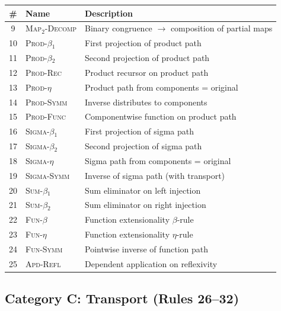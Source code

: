 \documentclass[manuscript]{BSLstyle}
\begin{document}
\begin{center}
\renewcommand{\arraystretch}{1.4}
\small
\begin{tabular}{clp{7cm}}
\toprule
\# & \textbf{Name} & \textbf{Description} \\
\midrule
9 & \textsc{Map$_2$-Decomp} & Binary congruence $\to$ composition of partial maps \\
10 & \textsc{Prod-$\beta_1$} & First projection of product path \\
11 & \textsc{Prod-$\beta_2$} & Second projection of product path \\
12 & \textsc{Prod-Rec} & Product recursor on product path \\
13 & \textsc{Prod-$\eta$} & Product path from components = original \\
14 & \textsc{Prod-Symm} & Inverse distributes to components \\
15 & \textsc{Prod-Func} & Componentwise function on product path \\
16 & \textsc{Sigma-$\beta_1$} & First projection of sigma path \\
17 & \textsc{Sigma-$\beta_2$} & Second projection of sigma path \\
18 & \textsc{Sigma-$\eta$} & Sigma path from components = original \\
19 & \textsc{Sigma-Symm} & Inverse of sigma path (with transport) \\
20 & \textsc{Sum-$\beta_1$} & Sum eliminator on left injection \\
21 & \textsc{Sum-$\beta_2$} & Sum eliminator on right injection \\
22 & \textsc{Fun-$\beta$} & Function extensionality $\beta$-rule \\
23 & \textsc{Fun-$\eta$} & Function extensionality $\eta$-rule \\
24 & \textsc{Fun-Symm} & Pointwise inverse of function path \\
25 & \textsc{Apd-Refl} & Dependent application on reflexivity \\
\bottomrule
\end{tabular}
\end{center}

\subsection*{Category C: Transport (Rules 26--32)}
\end{document}
